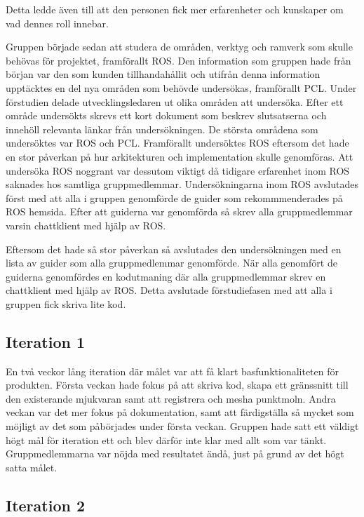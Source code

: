 Detta ledde även till att den personen fick mer erfarenheter och kunskaper om vad dennes roll innebar.

Gruppen började sedan att studera de områden, verktyg och ramverk som skulle behövas för projektet, framförallt ROS. Den information som gruppen hade från början var den som kunden tillhandahållit och utifrån denna information upptäcktes en del nya områden som behövde undersökas, framförallt PCL. Under förstudien delade utvecklingsledaren ut olika områden att undersöka. Efter ett område undersökts skrevs ett kort dokument som beskrev slutsatserna och innehöll relevanta länkar från undersökningen. De största områdena som undersöktes var ROS och PCL. Framförallt undersöktes ROS eftersom det hade en stor påverkan på hur arkitekturen och implementation skulle genomföras. Att undersöka ROS noggrant var dessutom viktigt då tidigare erfarenhet inom ROS saknades hos samtliga gruppmedlemmar. 
Undersökningarna inom ROS avslutades först med att alla i gruppen genomförde de guider som rekommmenderades på ROS hemsida. Efter att guiderna var genomförda så skrev alla gruppmedlemmar varsin chattklient med hjälp av ROS.

Eftersom det hade så stor påverkan så avslutades den undersökningen med en lista av guider som alla gruppmedlemmar genomförde. När alla genomfört de guiderna genomfördes en kodutmaning där alla gruppmedlemmar skrev en chattklient med hjälp av ROS. Detta avslutade förstudiefasen med att alla i gruppen fick skriva lite kod.

\subsection{Iteration 1}

En två veckor lång iteration där målet var att få klart basfunktionaliteten för produkten. Första veckan hade fokus på att skriva kod, skapa ett gränssnitt till den existerande mjukvaran samt att registrera och mesha punktmoln. Andra veckan var det mer fokus på dokumentation, samt att färdigställa så mycket som möjligt av det som påbörjades under första veckan. Gruppen hade satt ett väldigt högt mål för iteration ett och blev därför inte klar med allt som var tänkt. Gruppmedlemmarna var nöjda med resultatet ändå, just på grund av det högt satta målet.

\subsection{Iteration 2}

